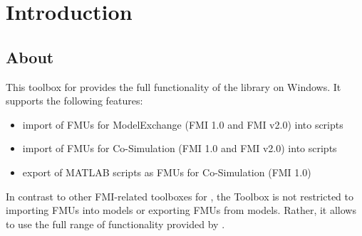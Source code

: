 \chapter{Introduction}


\section{About}

This toolbox for \matlab provides the full functionality of the \fmipp library on Windows.
It supports the following features:
\begin{itemize}
  \item import of FMUs for ModelExchange (FMI 1.0 and FMI v2.0) into \matlab scripts
  \item import of FMUs for Co-Simulation (FMI 1.0 and FMI v2.0) into \matlab scripts
  \item export of MATLAB scripts as FMUs for Co-Simulation (FMI 1.0)
\end{itemize}
In contrast to other FMI-related toolboxes for \matlab, the \fmipp \matlab Toolbox is not restricted to importing FMUs into \simulink models or exporting FMUs from \simulink models.
Rather, it allows to use the full range of functionality provided by \matlab.

